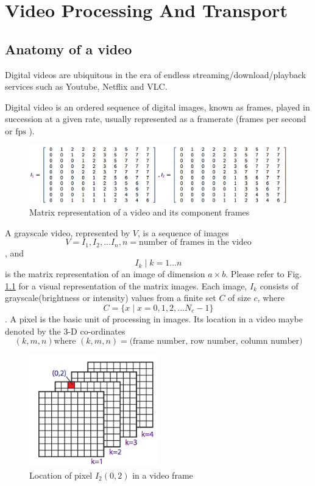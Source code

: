 \documentclass[letterpaper,12pt,titlepage,oneside,final]{report}
\newcommand{\mtext}[1]{
    $\text{#1}$
}
\begin{document}
\chapter{Video Processing And Transport}
    
    \section{Anatomy of a video}
        Digital videos are ubiquitous in the era of endless streaming/download/playback services such as Youtube, Netflix and VLC.
        
        Digital video is an ordered sequence of digital images, known as frames, played in succession at a given rate, usually represented as a framerate (frames per second or\mtext{fps}). 
        
        \begin{figure}[!h]
            \centering
            \includegraphics[width=\textwidth]{vidarch}
            \caption{Matrix representation of a video and its component frames}
            \label{vidarch}
        \end{figure}
        
        A grayscale video, represented by $V$, is a sequence of images $$ V = I_1, I_2, ... I_n, n = \text{number of frames in the video}$$, and $$I_k \mid k=1...n$$ is the matrix representation of an image of dimension $a \times b$. Please refer to Fig. \ref{vidarch} for a visual representation of the matrix images. Each image, $I_k$ consists of grayscale(brightness or intensity) values from a finite set $C$ of size $c$, where $$C = \{x \mid x = 0, 1, 2, ...N_c -1\}$$. A pixel is the basic unit of processing in images. Its location in a video maybe denoted by the 3-D co-ordinates 
        $$(k, m, n) \text{where } (k, m, n) = \text{(frame number, row number, column number)}$$
        
        \begin{figure}[!h]
            \centering
            \includegraphics[width=0.5\textwidth]{framearch}
            \caption{Location of pixel $I_2(0,2)$ in a video frame}
            \label{framearch}
        \end{figure}
        
\end{document}
